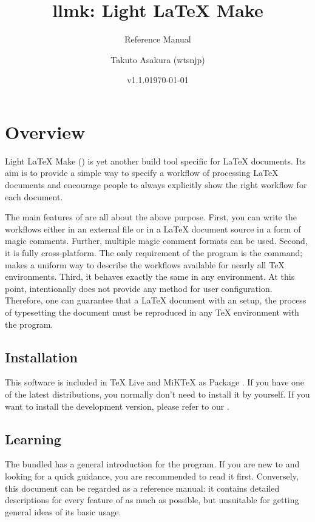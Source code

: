 \documentclass{llmk-doc}
\title{llmk: Light {\LaTeX} Make}
\author{Takuto Asakura (wtsnjp)}
\subtitle{Reference Manual}
\date{v1.1.0\quad\today}
\begin{document}
\maketitle

\section{Overview}

Light {\LaTeX} Make () is yet another build tool specific for
{\LaTeX} documents. Its aim is to provide a simple way to specify a workflow of
processing {\LaTeX} documents and encourage people to always explicitly show
the right workflow for each document.

The main features of  are all about the above purpose. First, you
can write the workflows either in an external file  or in a
{\LaTeX} document source in a form of magic comments. Further, multiple magic
comment formats can be used. Second, it is fully cross-platform. The only
requirement of the program is the  command;  makes a
uniform way to describe the workflows available for nearly all {\TeX}
environments. Third, it behaves exactly the same in any environment. At this
point,  intentionally does not provide any method for user
configuration. Therefore, one can guarantee that a {\LaTeX} document with an
 setup, the process of typesetting the document must be reproduced
in any {\TeX} environment with the program.

\subsection{Installation}

This software is included in {\TeX} Live and MiK{\TeX} as Package
. If you have one of the latest distributions, you
normally don't need to install it by yourself. If you want to install the
development version, please refer to our {\README}.

\subsection{Learning }

The bundled {\README} has a general introduction for the program. If you are
new to  and looking for a quick guidance, you are recommended to
read it first. Conversely, this document can be regarded as a reference manual:
it contains detailed descriptions for every feature of  as much as
possible, but unsuitable for getting general ideas of its basic usage.
\end{document}
